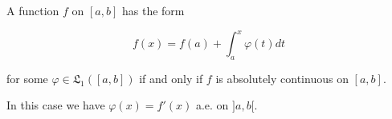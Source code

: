 A function $f$ on $[a, b]$ has the form

$$f(x) = f(a) + \int_{a}^{x} \varphi(t) dt$$

for some $\varphi \in \mathfrak{L}_1([a, b])$ if and only if $f$ is absolutely continuous on $[a, b]$.

In this case we have $\varphi(x) = f'(x)$ a.e. on $]a, b[$.